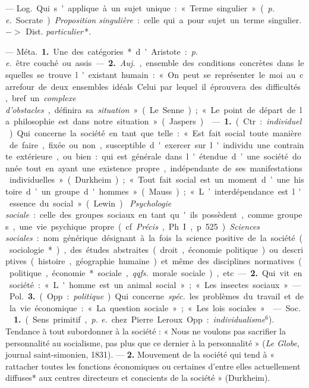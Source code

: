 \begin{itemize}[leftmargin=1cm, label=, itemsep=1pt]
 — \si{Log.} Qui s'applique à un sujet unique : « Terme
singulier » ({\it p. e.} Socrate). {\it Proposition singulière} : celle qui a
pour sujet un terme singulier. $->$ Dist. {\it particulier}\,*.

 — \si{Méta.} {\bf 1.} Une des catégories* d'Aristote :
{\it p. e.} être couché ou assis. — {\bf 2.} {\it Auj.}, ensemble des
conditions concrètes dans lesquelles se trouve l'existant humain : « On peut
se représenter le moi au carrefour de deux ensembles idéals. Celui par lequel
il éprouvera des
difficultés, bref un {\it complexe d’obstacles}, définira sa {\it situation}
» (Le Senne) ; « Le point de départ de la philosophie est dans notre
situation » (Jaspers).

 — {\bf 1.} (Ctr. : {\it individuel}). Qui concerne la société en
tant que telle : « Est fait social toute manière de faire, fixée ou non,
susceptible d'exercer sur l'individu une contrainte extérieure, ou bien : qui
est générale dans l'étendue d’une société donnée tout en ayant une existence
propre, indépendante de ses manifestations individuelles. » (Durkheim) ; «
Tout fait social est un moment d’une histoire d’un groupe d'hommes.
» (Mauss) ; « L’interdépendance est l'essence du social » (Lewin). {\it
Psychologie sociale} : celle des groupes sociaux en tant qu'ils possèdent,
comme groupes, une vie psychique propre (cf. {\it Précis}, Ph. I, p. 525).
{\it Sciences sociales} : nom générique désignant à la fois la science
positive de la société (sociologie*), des études abstraites (droit, économie
politique) ou descriptives (histoire, géographie humaine) et même des
disciplines normatives (politique, économie* sociale, {\it qqfs.} morale
sociale), etc. — {\bf 2.} Qui vit en société : « L'homme est un animal social
» ; « Les insectes sociaux. »

— \si{Pol.} {\bf 3.} (Opp. : {\it politique}). Qui
concerne {\it spéc.} les problèmes du travail et de la vie économique : « La
question sociale »; « Les lois sociales ».

 — \si{Soc.}  {\bf 1.} (Sens primitif, {\it p. e.} chez
Pierre Leroux. Opp. : {\it individualisme}$^6$). Tendance à tout subordonner
à la société : « Nous ne voulons pas sacrifier la personnalité au socialisme,
pas plus que ce dernier à la personnalité » ({\it Le Globe}, journal
saint-simonien, 1831). — {\bf 2.} Mouvement de la société qui tend à
« rattacher toutes les fonctions économiques ou certaines d’entre elles
actuellement diffuses* aux centres directeurs et conscients de la
société » (Durkheim).


\end{itemize}

